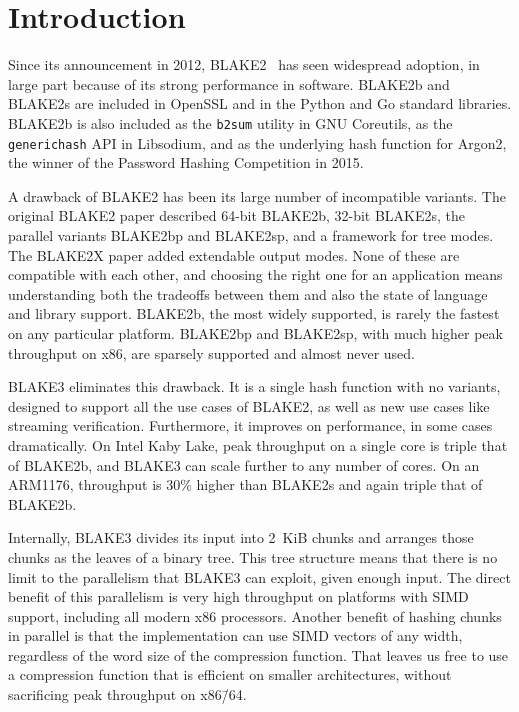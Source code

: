 \documentclass[11pt,notitlepage,a4paper]{article}
\begin{document}
\smallskip

\section{Introduction}\label{sec:intro}

Since its announcement in 2012, BLAKE2~\cite{DBLP:conf/acns/AumassonNWW13} has 
seen widespread adoption, in large
part because of its strong performance in software. BLAKE2b and BLAKE2s are
included in OpenSSL and in the Python and Go standard libraries. BLAKE2b is
also included as the \texttt{b2sum} utility in GNU Coreutils, as the
\texttt{generichash} API in Libsodium, and as the underlying hash function for
Argon2, the winner of the Password Hashing Competition in 2015.

A drawback of BLAKE2 has been its large number of incompatible variants. The
original BLAKE2 paper described 64-bit BLAKE2b, 32-bit BLAKE2s, the parallel
variants BLAKE2bp and BLAKE2sp, and a framework for tree modes. The BLAKE2X
paper added extendable output modes. None of these are compatible with each
other, and choosing the right one for an application means understanding both
the tradeoffs between them and also the state of language and library support.
BLAKE2b, the most widely supported, is rarely the fastest on any particular
platform. BLAKE2bp and BLAKE2sp, with much higher peak throughput on x86, are
sparsely supported and almost never used.

BLAKE3 eliminates this drawback. It is a single hash function with no variants,
designed to support all the use cases of BLAKE2, as well as new use cases like
streaming verification. Furthermore, it improves on performance, in some cases
dramatically. On Intel Kaby Lake, peak throughput on a single core is triple
that of BLAKE2b, and BLAKE3 can scale further to any number of cores. On an
ARM1176, throughput is 30\% higher than BLAKE2s and again triple that of
BLAKE2b.

Internally, BLAKE3 divides its input into 2~KiB chunks and arranges those
chunks as the leaves of a binary tree. This tree structure means that there is
no limit to the parallelism that BLAKE3 can exploit, given enough input. The
direct benefit of this parallelism is very high throughput on platforms with
SIMD support, including all modern x86 processors. Another benefit of hashing
chunks in parallel is that the implementation can use SIMD vectors of any
width, regardless of the word size of the compression function. That leaves us
free to use a compression function that is efficient on smaller architectures,
without sacrificing peak throughput on x86\=/64.
\end{document}
